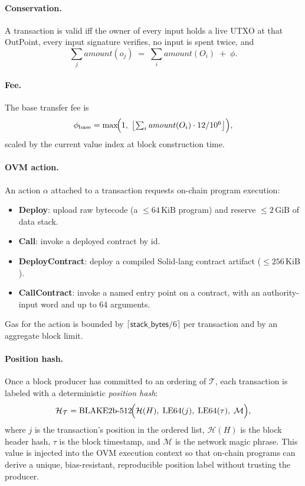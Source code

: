 \documentclass[11pt,a4paper]{article}
\theoremstyle{definition}
\newcommand{\outpoint}{\textsf{OutPoint}}
\newcommand{\hash}{\mathcal{H}}
\begin{document}
\paragraph{Conservation.}
A transaction is valid iff the owner of every input holds a live UTXO at that
\outpoint, every input signature verifies, no input is spent twice, and
\[
\sum_j \mathit{amount}(o_j) \;=\; \sum_i \mathit{amount}(O_i) \;+\; \phi.
\]

\paragraph{Fee.}
The base transfer fee is
\[
\phi_{\mathrm{base}} = \max\!\Bigl(1,\; \bigl\lfloor
  \textstyle\sum_i \mathit{amount}(O_i) \cdot 12 / 10^{6}\bigr\rfloor\Bigr),
\]
scaled by the current value index at block construction time.

\paragraph{OVM action.}
An action $\alpha$ attached to a transaction requests on-chain program execution:
\begin{itemize}[leftmargin=2em]
  \item \textbf{Deploy}: upload raw bytecode (a $\leq 64\,\mathrm{KiB}$ program)
    and reserve $\leq 2\,\mathrm{GiB}$ of data stack.
  \item \textbf{Call}: invoke a deployed contract by id.
  \item \textbf{DeployContract}: deploy a compiled Solid-lang contract artifact
    ($\leq 256\,\mathrm{KiB}$).
  \item \textbf{CallContract}: invoke a named entry point on a contract, with
    an authority-input word and up to 64 arguments.
\end{itemize}
Gas for the action is bounded by $\lceil\mathsf{stack\_bytes}/6\rceil$ per
transaction and by an aggregate block limit.

\paragraph{Position hash.}
Once a block producer has committed to an ordering of $\mathcal{T}$, each
transaction is labeled with a deterministic \emph{position hash}:
\[
\hash_{\mathcal{T}} = \mathrm{BLAKE2b\text{-}512}\!\Bigl(
  \hash(H),\; \mathrm{LE64}(j),\; \mathrm{LE64}(\tau),\; \mathcal{M}
\Bigr),
\]
where $j$ is the transaction's position in the ordered list, $\hash(H)$ is
the block header hash, $\tau$ is the block timestamp, and $\mathcal{M}$ is the
network magic phrase.  This value is injected into the OVM execution context so
that on-chain programs can derive a unique, bias-resistant, reproducible
position label without trusting the producer.
\end{document}
